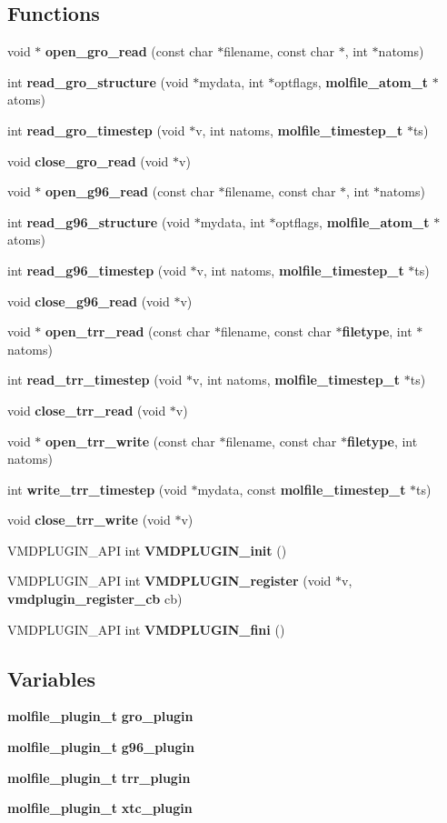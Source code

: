 \subsection*{Functions}
\begin{CompactItemize}
\item 
void $\ast$ {\bf open\_\-gro\_\-read} (const char $\ast$filename, const char $\ast$, int $\ast$natoms)
\item 
int {\bf read\_\-gro\_\-structure} (void $\ast$mydata, int $\ast$optflags, {\bf molfile\_\-atom\_\-t} $\ast$atoms)
\item 
int {\bf read\_\-gro\_\-timestep} (void $\ast$v, int natoms, {\bf molfile\_\-timestep\_\-t} $\ast$ts)
\item 
void {\bf close\_\-gro\_\-read} (void $\ast$v)
\item 
void $\ast$ {\bf open\_\-g96\_\-read} (const char $\ast$filename, const char $\ast$, int $\ast$natoms)
\item 
int {\bf read\_\-g96\_\-structure} (void $\ast$mydata, int $\ast$optflags, {\bf molfile\_\-atom\_\-t} $\ast$atoms)
\item 
int {\bf read\_\-g96\_\-timestep} (void $\ast$v, int natoms, {\bf molfile\_\-timestep\_\-t} $\ast$ts)
\item 
void {\bf close\_\-g96\_\-read} (void $\ast$v)
\item 
void $\ast$ {\bf open\_\-trr\_\-read} (const char $\ast$filename, const char $\ast${\bf filetype}, int $\ast$natoms)
\item 
int {\bf read\_\-trr\_\-timestep} (void $\ast$v, int natoms, {\bf molfile\_\-timestep\_\-t} $\ast$ts)
\item 
void {\bf close\_\-trr\_\-read} (void $\ast$v)
\item 
void $\ast$ {\bf open\_\-trr\_\-write} (const char $\ast$filename, const char $\ast${\bf filetype}, int natoms)
\item 
int {\bf write\_\-trr\_\-timestep} (void $\ast$mydata, const {\bf molfile\_\-timestep\_\-t} $\ast$ts)
\item 
void {\bf close\_\-trr\_\-write} (void $\ast$v)
\item 
VMDPLUGIN\_\-API int {\bf VMDPLUGIN\_\-init} ()
\item 
VMDPLUGIN\_\-API int {\bf VMDPLUGIN\_\-register} (void $\ast$v, {\bf vmdplugin\_\-register\_\-cb} cb)
\item 
VMDPLUGIN\_\-API int {\bf VMDPLUGIN\_\-fini} ()
\end{CompactItemize}
\subsection*{Variables}
\begin{CompactItemize}
\item 
{\bf molfile\_\-plugin\_\-t} {\bf gro\_\-plugin}
\item 
{\bf molfile\_\-plugin\_\-t} {\bf g96\_\-plugin}
\item 
{\bf molfile\_\-plugin\_\-t} {\bf trr\_\-plugin}
\item 
{\bf molfile\_\-plugin\_\-t} {\bf xtc\_\-plugin}
\end{CompactItemize}


